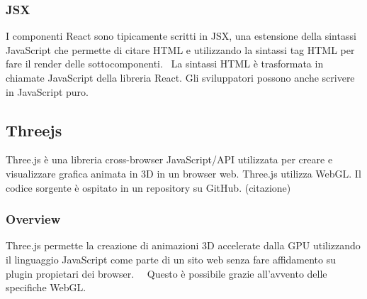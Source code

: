 \subsubsection{JSX}
I componenti React sono tipicamente scritti in JSX, una estensione della sintassi JavaScript che permette di citare
HTML e utilizzando la sintassi tag HTML per fare  il render delle sottocomponenti.~\cite{jsx}
La sintassi HTML è trasformata in chiamate JavaScript
della libreria React. Gli sviluppatori possono anche scrivere in JavaScript puro.



\newpage
\subsection{Threejs}
\label{sec:chapter_2_section_3_sub_2}
Three.js \`e una libreria cross-browser JavaScript/API utilizzata per creare e visualizzare grafica animata in 3D
in un browser web. Three.js utilizza WebGL. Il codice sorgente è ospitato in un repository su GitHub. (citazione)

\subsubsection{Overview}
Three.js permette la creazione di animazioni 3D accelerate dalla GPU utilizzando il linguaggio JavaScript
come parte di un sito web senza fare affidamento su plugin propietari dei browser.~\cite{O3D}~\cite{unity}
 Questo è possibile grazie all'avvento delle specifiche WebGL.~\cite{khronos}

